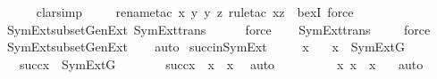\begin{isabellebody}
\ \ \ \ \isamarkupfalse%
\ clarsimp\isanewline
\ \ \ \ \isamarkupfalse%
{\isacharparenleft}{\kern0pt}rename{\isacharunderscore}{\kern0pt}tac\ x\ y\ y{\isacharprime}{\kern0pt}\ z{\isacharcomma}{\kern0pt}\ rule{\isacharunderscore}{\kern0pt}tac\ x{\isacharequal}{\kern0pt}z\ \ bexI{\isacharcomma}{\kern0pt}\ force{\isacharparenright}{\kern0pt}\isanewline
\ \ \isamarkupfalse%
\ SymExt{\isacharunderscore}{\kern0pt}subset{\isacharunderscore}{\kern0pt}GenExt\ SymExt{\isacharunderscore}{\kern0pt}trans\isanewline
\ \ \ \ \isamarkupfalse%
\ force\isanewline
\ \ \isamarkupfalse%
\ SymExt{\isacharunderscore}{\kern0pt}trans\isanewline
\ \ \ \isamarkupfalse%
\ force\isanewline
\ \ \isamarkupfalse%
\ SymExt{\isacharunderscore}{\kern0pt}subset{\isacharunderscore}{\kern0pt}GenExt\isanewline
\ \ \isamarkupfalse%
\ auto%
\endisatagproof
{\isafoldproof}%
%
\isadelimproof
\isanewline
%
\endisadelimproof
\isanewline
{}\isamarkupfalse%
\ succ{\isacharunderscore}{\kern0pt}in{\isacharunderscore}{\kern0pt}SymExt\ {\isacharcolon}{\kern0pt}\ \isanewline
\ \ \ x\isanewline
\ \ \ {\isachardoublequoteopen}x\ {\isasymin}\ SymExt{\isacharparenleft}{\kern0pt}G{\isacharparenright}{\kern0pt}{\isachardoublequoteclose}\ \isanewline
\ \ \ {\isachardoublequoteopen}succ{\isacharparenleft}{\kern0pt}x{\isacharparenright}{\kern0pt}\ {\isasymin}\ SymExt{\isacharparenleft}{\kern0pt}G{\isacharparenright}{\kern0pt}{\isachardoublequoteclose}\ \isanewline
%
\isadelimproof
%
\endisadelimproof
%
\isatagproof
{}\isamarkupfalse%
\ {\isacharminus}{\kern0pt}\ \isanewline
\ \ \isamarkupfalse%
\ {\isachardoublequoteopen}succ{\isacharparenleft}{\kern0pt}x{\isacharparenright}{\kern0pt}\ {\isacharequal}{\kern0pt}\ {\isacharbraceleft}{\kern0pt}x{\isacharbraceright}{\kern0pt}\ {\isasymunion}\ x{\isachardoublequoteclose}\ \isamarkupfalse%
\ auto\isanewline
\ \ \isamarkupfalse%
\ \isamarkupfalse%
\ {\isachardoublequoteopen}{\isachardot}{\kern0pt}{\isachardot}{\kern0pt}{\isachardot}{\kern0pt}\ {\isacharequal}{\kern0pt}\ {\isasymUnion}\ {\isacharbraceleft}{\kern0pt}\ {\isacharbraceleft}{\kern0pt}x{\isacharcomma}{\kern0pt}\ x{\isacharbraceright}{\kern0pt}\ {\isacharcomma}{\kern0pt}\ x\ {\isacharbraceright}{\kern0pt}{\isachardoublequoteclose}\ \isamarkupfalse%
\ auto\isanewline
\ \ \isamarkupfalse%

\end{isabellebody}
